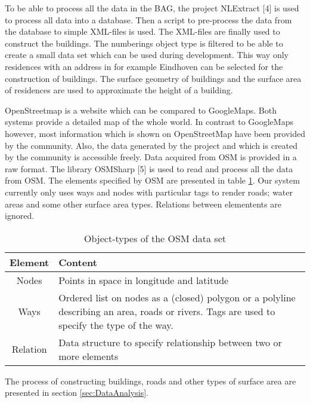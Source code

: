 To be able to process all the data in the BAG, the project NLExtract [4] is used to process all data into a database. Then a script to pre-process the data from the database to simple XML-files is used. The XML-files are finally used to construct the buildings. The numberings object type is filtered to be able to create a small data set which can be used during development. This way only residences with an address in for example Eindhoven can be selected for the construction of buildings. The surface geometry of buildings and the surface area of residences are used to approximate the height of a building.

OpenStreetmap is a website which can be compared to GoogleMaps. Both systems provide a detailed map of the whole world. In contrast to GoogleMaps however, most information which is shown on OpenStreetMap have been provided by the community. Also, the data generated by the project and which is created by the community is accessible freely. Data acquired from OSM is provided in a raw format. The library OSMSharp [5] is used to read and process all the data from OSM. The elements specified by OSM are presented in table \ref{Table:ObjectTypesOSM}. Our system currently only uses ways and nodes with particular tags to render roads; water areas and some other surface area types. Relations between elementents are ignored.
\begin{table}[h]
    \centering
    \begin{tabular}{c p{10cm}}
       \textbf{Element} &  \textbf{Content}     \\ \hline
      Nodes & Points in space in longitude and latitude  \\ \hline
      Ways & Ordered list on nodes as a (closed) polygon or a polyline describing an area, roads or rivers. Tags are used to specify the type of the way.  \\ \hline
      Relation & Data structure to specify relationship between two or more elements  \\
    \end{tabular}
    \caption{Object-types of the OSM data set}
    \label{Table:ObjectTypesOSM}
\end{table}

The process of constructing buildings, roads and other types of surface area are presented in section \ref{sec:DataAnalysis}. 